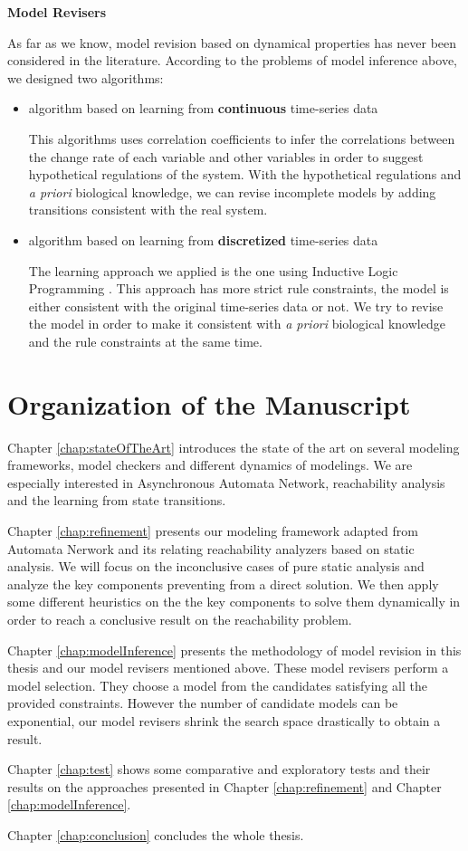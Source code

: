 
\textbf{Model Revisers}

As far as we know, model revision based on dynamical properties has never been considered in the literature.
According to the problems of model inference above, we designed two algorithms:
\begin{itemize}
    \item algorithm based on learning from \textbf{continuous} time-series data
    
    This algorithms uses correlation coefficients to infer the correlations between the change rate of each variable and other variables in order to suggest hypothetical regulations of the system.
    With the hypothetical regulations and \textit{a priori} biological knowledge, we can revise incomplete models by adding transitions consistent with the real system.
    \item algorithm based on learning from \textbf{discretized} time-series data
    
    The learning approach we applied is the one using Inductive Logic Programming \cite{ribeiro2018learning}.
    This approach has more strict rule constraints, the model is either consistent with the original time-series data or not.
    We try to revise the model in order to make it consistent with \textit{a priori} biological knowledge and the rule constraints at the same time.
\end{itemize}


\section{Organization of the Manuscript}
Chapter \ref{chap:stateOfTheArt} introduces the state of the art on several modeling frameworks, model checkers and different dynamics of modelings.
We are especially interested in Asynchronous Automata Network, reachability analysis and the learning from state transitions.

Chapter \ref{chap:refinement} presents our modeling framework adapted from Automata Nerwork and its relating reachability analyzers based on static analysis.
We will focus on the inconclusive cases of pure static analysis and analyze the key components preventing from a direct solution.
We then apply some different heuristics on the the key components to solve them dynamically in order to reach a conclusive result on the reachability problem.

Chapter \ref{chap:modelInference} presents the methodology of model revision in this thesis and our model revisers mentioned above.
These model revisers perform a model selection. 
They choose a model from the candidates satisfying all the provided constraints.
However the number of candidate models can be exponential, our model revisers shrink the search space drastically to obtain a result.

Chapter \ref{chap:test} shows some comparative and exploratory tests and their results on the approaches presented in Chapter \ref{chap:refinement} and Chapter \ref{chap:modelInference}.

Chapter \ref{chap:conclusion} concludes the whole thesis.